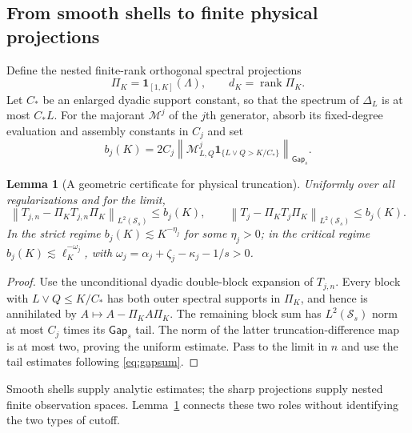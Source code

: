 \documentclass[11pt,a4paper]{amsart}
\numberwithin{equation}{section}
\newtheorem{lemma}[theorem]{Lemma}
\theoremstyle{definition}
\theoremstyle{remark}
\newcommand{\Sch}{\mathcal S}
\DeclareMathOperator{\rank}{rank}
\newcommand{\norm}[1]{\left\lVert#1\right\rVert}
\begin{document}
\subsection{From smooth shells to finite physical projections}
Define the nested finite-rank orthogonal spectral projections
\[
 \Pi_K=\mathbf1_{[1,K]}(\Lambda),\qquad d_K=\rank\Pi_K.
\]
Let $C_*$ be an enlarged dyadic support constant, so that the spectrum of $\Delta_L$ is at most $C_*L$. For the majorant $\mathcal M^j$ of the $j$th generator, absorb its fixed-degree evaluation and assembly constants in $C_j$ and set
\begin{equation}\label{eq:geometric_spatial_certificate}
 b_j(K)=2C_j\left\|\mathcal M^j_{L,Q}
             \mathbf1_{\{L\vee Q>K/C_*\}}\right\|_{\mathsf{Gap}_s}.
\end{equation}
\begin{lemma}[A geometric certificate for physical truncation]\label{lem:geometric_spatial_tail}
Uniformly over all regularizations and for the limit,
\begin{equation}\label{eq:physical_projection_tail}
 \norm{T_{j,n}-\Pi_KT_{j,n}\Pi_K}_{L^2(\Sch_s)}\le b_j(K),\qquad
 \norm{T_j-\Pi_KT_j\Pi_K}_{L^2(\Sch_s)}\le b_j(K).
\end{equation}
In the strict regime $b_j(K)\lesssim K^{-\eta_j}$ for some $\eta_j>0$; in the critical regime $b_j(K)\lesssim\ell_K^{-\omega_j}$, with $\omega_j=\alpha_j+\zeta_j-\kappa_j-1/s>0$.
\end{lemma}
\begin{proof}
Use the unconditional dyadic double-block expansion of $T_{j,n}$. Every block with $L\vee Q\le K/C_*$ has both outer spectral supports in $\Pi_K$, and hence is annihilated by $A\mapsto A-\Pi_KA\Pi_K$. The remaining block sum has $L^2(\Sch_s)$ norm at most $C_j$ times its $\mathsf{Gap}_s$ tail. The norm of the latter truncation-difference map is at most two, proving the uniform estimate. Pass to the limit in $n$ and use the tail estimates following \eqref{eq:gapsum}.
\end{proof}
Smooth shells supply analytic estimates; the sharp projections supply nested finite observation spaces. Lemma~\ref{lem:geometric_spatial_tail} connects these two roles without identifying the two types of cutoff.
\end{document}
